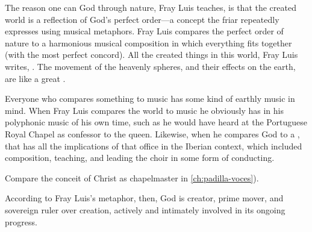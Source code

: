 The reason one can  God through nature, Fray Luis teaches, is that
the created world is a reflection of God's perfect order---a concept the friar
repeatedly expresses using musical metaphors.
Fray Luis compares the perfect order of nature to a harmonious musical
composition in which everything fits together 
(with the most perfect concord).
All the created things in this world, Fray Luis writes, .%
    \Autocite[191]{LuisdeGranada:Simbolo}
The movement of the heavenly spheres, and their effects on the earth, are like
a great .%
    \Autocite[191]{LuisdeGranada:Simbolo}

Everyone who compares something to music has some kind of earthly music in
mind.
When Fray Luis compares the world to music  he
obviously has in his  polyphonic music of his own time, such
as he would have heard at the Portuguese Royal Chapel as confessor to the
queen.%
Likewise, when he compares God to a , that has all
the implications of that office in the Iberian context, which included
composition, teaching, and leading the choir in some form of conducting.%
\begin{Footnote}
    Compare the conceit of Christ as chapelmaster in \cref{ch:padilla-voces}).
\end{Footnote}
According to Fray Luis's metaphor, then, God is creator, prime mover, and
sovereign ruler over creation, actively and intimately involved in its ongoing
progress.


